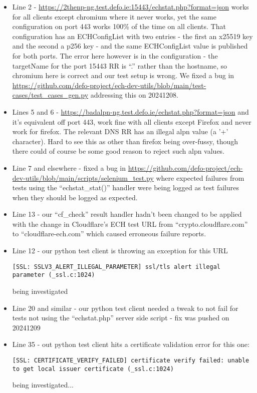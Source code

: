 \begin{itemize}
\item Line 2 - \url{https://2thenp-ng.test.defo.ie:15443/echstat.php?format=json} works for all
    clients except chromium where it never works, yet the same configuration on port 443 works
    100\% of the time on all clients. That configuration has an ECHConfigList with two
    entries - the first an x25519 key and the second a p256 key - and the same ECHConfigList 
    value is published for both ports. The error here however is in the configuration - the
    targetName for the port 15443 RR is ``.'' rather than the hostname, so chromium here
    is correct and our test setup is wrong. We fixed a bug in 
    \url{https://github.com/defo-project/ech-dev-utils/blob/main/test-cases/test_cases_gen.py}
        addressing this on 20241208.\\
\item Lines 5 and 6 - \url{https://badalpn-ng.test.defo.ie/echstat.php?format=json} and
    it's equivalent off port 443, work fine with all clients except Firefox and never work
    for firefox. The relevant DNS RR has an illegal alpn value (a '+' character). Hard to
    see this as other than firefox being over-fussy, though there could of course be some
    good reason to reject such alpn values.
\item Line 7 and elsewhere - fixed a bug in 
    \url{https://github.com/defo-project/ech-dev-utils/blob/main/scripts/selenium_test.py} where
        expected failures from tests using the ``echstat\_stat()'' handler were being logged as 
        test failures when they should be logged as expected.
    \item Line 13 - our ``cf\_check'' result handler hadn't been changed to be applied 
        with the change in Cloudflare's ECH test URL from ``crypto.cloudflare.com'' to
        ``cloudflare-ech.com'' which caused erroneous failure reports.
    \item Line 12 - our python test client is throwing an exception for this URL
        \begin{verbatim}
[SSL: SSLV3_ALERT_ILLEGAL_PARAMETER] ssl/tls alert illegal parameter (_ssl.c:1024)
        \end{verbatim}
        being investigated
    \item Line 20 and similar - our python test client needed a tweak to not fail
        for tests not using the ``echstat.php'' server side script - fix was pushed
        on 20241209
    \item Line 35 - out python test client hits a certificate validation error for
        this one:
        \begin{verbatim}
[SSL: CERTIFICATE_VERIFY_FAILED] certificate verify failed: unable to get local issuer certificate (_ssl.c:1024)
        \end{verbatim}
        being investigated...
        
\end{itemize}

